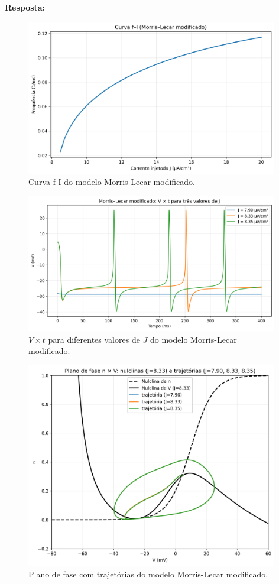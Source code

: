 \documentclass[english,11pt,a4paper]{article}
\begin{document}
	\noindent\textbf{Resposta:}
	
	\begin{figure}[H]
		\centering
		\includegraphics[width=11cm]{../figures/ex_2f_fI.png}
		\caption{Curva f-I do modelo Morris-Lecar modificado.}
	\end{figure}
	
	\begin{figure}[H]
		\centering
		\includegraphics[width=11cm]{../figures/ex_2f_Vt.png}
		\caption{$V \times t$ para diferentes valores de $J$ do modelo Morris-Lecar modificado.}
	\end{figure}
	
	\begin{figure}[H]
		\centering
		\includegraphics[width=11cm]{../figures/ex_2f_phase.png}
		\caption{Plano de fase com trajetórias do modelo Morris-Lecar modificado.}
	\end{figure}
	
\end{document}
